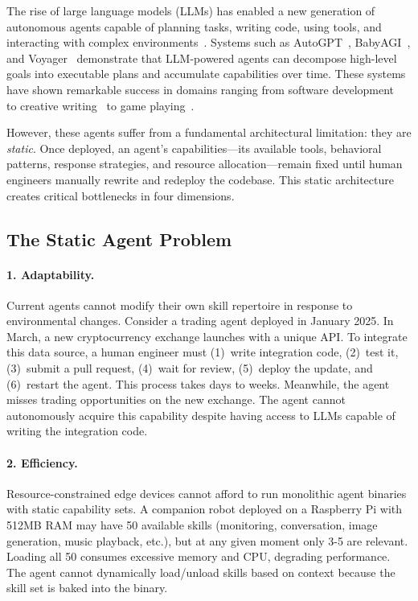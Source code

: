 \documentclass{article}
\begin{document}
The rise of large language models (LLMs) has enabled a new generation of autonomous agents capable of planning tasks, writing code, using tools, and interacting with complex environments~\cite{wang2023survey, xi2023rise}. Systems such as AutoGPT~\cite{auto_gpt}, BabyAGI~\cite{babyagi}, and Voyager~\cite{wang2023voyager} demonstrate that LLM-powered agents can decompose high-level goals into executable plans and accumulate capabilities over time. These systems have shown remarkable success in domains ranging from software development~\cite{yang2024sweagent} to creative writing~\cite{ji2023rachel} to game playing~\cite{wang2023voyager}.

However, these agents suffer from a fundamental architectural limitation: they are \textit{static}. Once deployed, an agent's capabilities---its available tools, behavioral patterns, response strategies, and resource allocation---remain fixed until human engineers manually rewrite and redeploy the codebase. This static architecture creates critical bottlenecks in four dimensions.

\subsection{The Static Agent Problem}

\paragraph{1. Adaptability.}
Current agents cannot modify their own skill repertoire in response to environmental changes. Consider a trading agent deployed in January 2025. In March, a new cryptocurrency exchange launches with a unique API. To integrate this data source, a human engineer must (1)~write integration code, (2)~test it, (3)~submit a pull request, (4)~wait for review, (5)~deploy the update, and (6)~restart the agent. This process takes days to weeks. Meanwhile, the agent misses trading opportunities on the new exchange. The agent cannot autonomously acquire this capability despite having access to LLMs capable of writing the integration code.

\paragraph{2. Efficiency.}
Resource-constrained edge devices cannot afford to run monolithic agent binaries with static capability sets. A companion robot deployed on a Raspberry Pi with 512MB RAM may have 50 available skills (monitoring, conversation, image generation, music playback, etc.), but at any given moment only 3-5 are relevant. Loading all 50 consumes excessive memory and CPU, degrading performance. The agent cannot dynamically load/unload skills based on context because the skill set is baked into the binary.
\end{document}

